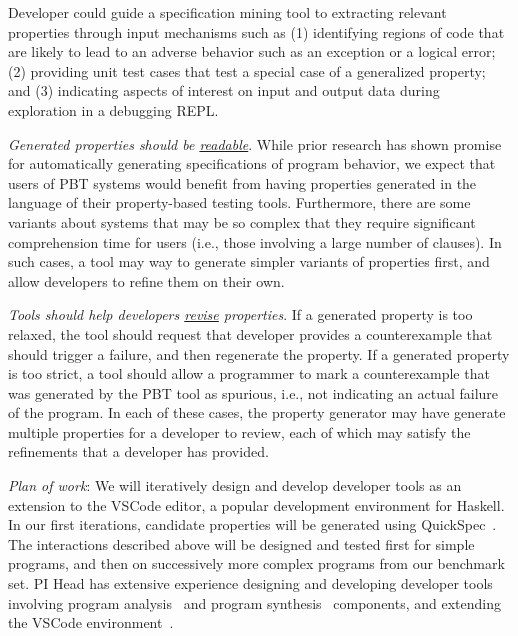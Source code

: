Developer could guide a specification mining tool to extracting relevant
properties through input mechanisms such as (1) identifying regions of code that
are likely to lead to an adverse behavior such as an exception or a logical
error; (2) providing unit test cases that test a special case of a generalized
property; and (3) indicating aspects of interest on input and output data during
exploration in a debugging REPL.

\textit{Generated properties should be \underline{readable}}. While prior research
has shown promise for automatically generating specifications of program
behavior, we expect that users of PBT systems would benefit from having
properties generated in the language of their property-based testing tools.
Furthermore, there are some variants about systems that may be so complex that
they require significant comprehension time for users (i.e., those involving a
large number of clauses). In such cases, a tool may way to generate simpler
variants of properties first, and allow developers to refine them on their own.

\textit{Tools should help developers \underline{revise} properties}. If a generated
property is too relaxed, the tool should request that developer provides a
counterexample that should trigger a failure, and then regenerate the property.
If a generated property is too strict, a tool should allow a programmer to mark
a counterexample that was generated by the PBT tool as spurious, i.e., not
indicating an actual failure of the program. In each of these cases, the
property generator may have generate multiple properties for a developer to
review, each of which may satisfy the refinements that a developer has provided.

\textit{Plan of work}: We will iteratively design and develop developer tools as
an extension to the VSCode editor, a popular development environment for
Haskell. In our first iterations, candidate properties will be generated using
QuickSpec~\cite{claessen2010quickspec}. The interactions described above will be
designed and tested first for simple programs, and then on successively more
complex programs from our benchmark set. PI Head has extensive experience
designing and developing developer tools involving program
analysis~\cite{head2018interactive,head2019managing} and program
synthesis~\cite{head2017writing} components, and extending the VSCode
environment~\cite{head2020composing}.   

